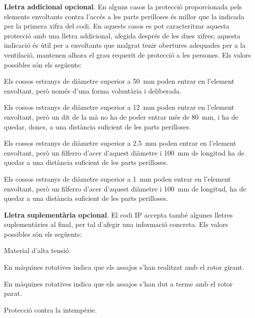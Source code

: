 \textbf{Lletra addicional opcional}. En alguns casos la protecció
proporcionada pels elements envoltants contra l'accés a les parts
perilloses és millor que la indicada per la primera xifra del codi.
En aquests casos es pot caracteritzar aquesta protecció amb una
lletra addicional, afegida després de les dues xifres; aquesta indicació és útil per a  envoltants que malgrat tenir obertures adequades per a la ventilació,  mantenen alhora el
grau requerit de protecció a les persones. Els valors possibles són
els següents:
\begin{list}{}
	{\setlength{\labelwidth}{10mm} \setlength{\leftmargin}{15mm} \setlength{\labelsep}{5mm}}
	\item[A] Els  cossos estranys de diàmetre superior a
	\qty{50}{mm}    poden entrar en l'element envoltant, però només d'una forma voluntària i deliberada.
	\item[B] Els  cossos estranys de diàmetre superior a \qty{12}{mm}
	poden entrar en l'element envoltant, però un dit de la mà no ha de poder entrar més de \qty{80}{mm}, i
	ha de quedar, doncs, a una distància    suficient de les parts perilloses.
	\item[C] Els  cossos estranys de diàmetre superior a \qty{2,5}{mm}
	poden entrar en l'element envoltant, però un filferro d'acer d'aquest diàmetre i \qty{100}{mm}
	de longitud ha de quedar a una distància suficient de les parts perilloses.
	\item[D] Els  cossos estranys de diàmetre superior a \qty{1}{mm}
	poden entrar en l'element envoltant, però un filferro d'acer d'aquest diàmetre i \qty{100}{mm}
	de longitud, ha de quedar a una distància suficient de les parts perilloses.
\end{list}

\textbf{Lletra suplementària opcional}. El codi IP accepta també algunes
lletres suplementàries al final, per tal d'afegir una informació concreta. Els valors
possibles són els següents:
\begin{list}{}
	{\setlength{\labelwidth}{10mm} \setlength{\leftmargin}{15mm} \setlength{\labelsep}{5mm}}
	\item[H] Material d'alta tensió.
	\item[M] En màquines rotatives indica que els assajos s'han realitzat amb el
	rotor girant.
	\item[S] En màquines rotatives indica que els assajos s'han dut a terme amb el
	rotor parat.
	\item[W] Protecció contra la intempèrie.
\end{list}


